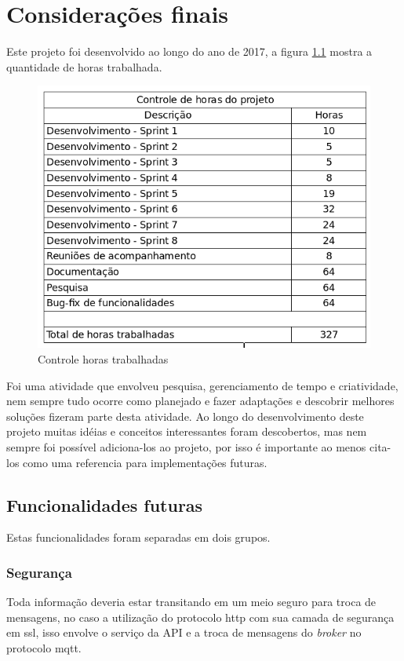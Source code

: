 \chapter{Considerações finais}
Este projeto foi desenvolvido ao longo do ano de 2017, a figura \ref{horas-trabalhadas} mostra a quantidade de horas trabalhada.

\begin{figure}[H]
\caption{\label{horas-trabalhadas} Controle horas trabalhadas}
\includegraphics[scale=0.4]{img/horas-trabalhadas.png}
\end{figure}

Foi uma atividade que envolveu pesquisa, gerenciamento de tempo e criatividade, nem sempre tudo ocorre como planejado e fazer adaptações e descobrir melhores soluções fizeram parte desta atividade. Ao longo do desenvolvimento deste projeto muitas idéias e conceitos interessantes foram descobertos, mas nem sempre foi possível adiciona-los ao projeto, por isso é importante ao menos cita-los como uma referencia para implementações futuras.

\section{Funcionalidades futuras}
Estas funcionalidades foram separadas em dois grupos.

\subsection{Segurança}
Toda informação deveria estar transitando em um meio seguro para troca de mensagens, no caso a utilização do protocolo http com sua camada de segurança em ssl, isso envolve o serviço da API e a troca de mensagens do \textit{broker} no protocolo mqtt.

